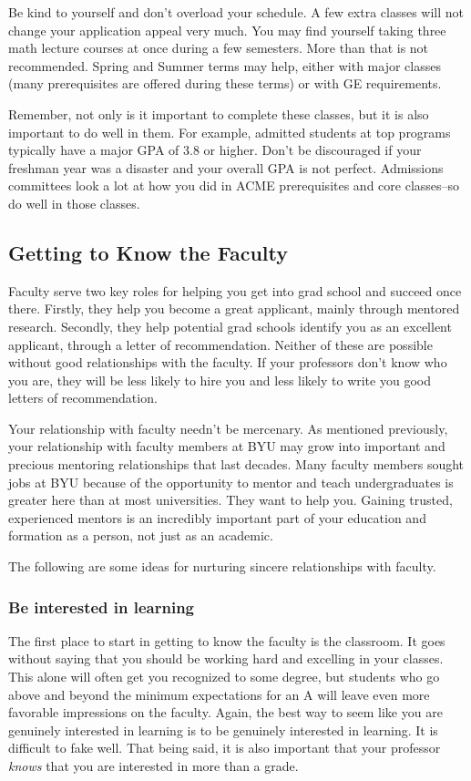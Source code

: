 \documentclass[11pt]{article}
\begin{document}
Be kind to yourself and don't overload your schedule. A few extra classes will not change your application appeal very much. You may find yourself taking three math lecture courses at once during a few semesters. More than that is not recommended. Spring and Summer terms may help, either with major classes (many prerequisites are offered during these terms) or with GE requirements.

Remember, not only is it important to complete these classes, but it is also important to do well in them. For example, admitted students at top programs typically have a major GPA of 3.8 or higher. Don’t be discouraged if your freshman year was a disaster and your overall GPA is not perfect. Admissions committees look a lot at how you did in ACME prerequisites and core classes--so do well in those classes.

\subsection{Getting to Know the Faculty}
Faculty serve two key roles for helping you get into grad school and succeed once there. Firstly, they help you become a great applicant, mainly through mentored research. Secondly, they help potential grad schools identify you as an excellent applicant, through a letter of recommendation. Neither of these are possible without good relationships with the faculty. If your professors don't know who you are, they will be less likely to hire you and less likely to write you good letters of recommendation. 

Your relationship with faculty needn't be mercenary. As mentioned previously, your relationship with faculty members at BYU may grow into important and precious mentoring relationships that last decades. Many faculty members sought jobs at BYU because of the opportunity to mentor and teach undergraduates is greater here than at most universities. They want to help you. Gaining trusted, experienced mentors is an incredibly important part of your education and formation as a person, not just as an academic.

The following are some ideas for nurturing sincere relationships with faculty.

\subsubsection*{Be interested in learning}
The first place to start in getting to know the faculty is the classroom. It goes without saying that you should be working hard and excelling in your classes. This alone will often get you recognized to some degree, but students who go above and beyond the minimum expectations for an A will leave even more favorable impressions on the faculty. Again, the best way to seem like you are genuinely interested in learning is to be genuinely interested in learning. It is difficult to fake well. That being said, it is also important that your professor \emph{knows} that you are interested in more than a grade.
\end{document}
